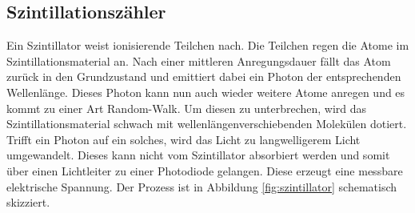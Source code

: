 \subsection{Szintillationszähler}
Ein Szintillator weist ionisierende Teilchen nach. Die Teilchen regen die Atome im Szintillationsmaterial an. Nach einer mittleren Anregungsdauer fällt das Atom zurück in den Grundzustand und emittiert dabei ein Photon der entsprechenden Wellenlänge. Dieses Photon kann nun auch wieder weitere Atome anregen und es kommt zu einer Art Random-Walk. Um diesen zu unterbrechen, wird das Szintillationsmaterial schwach mit wellenlängenverschiebenden Molekülen dotiert. Trifft ein Photon auf ein solches, wird das Licht zu langwelligerem Licht umgewandelt. Dieses kann nicht vom Szintillator absorbiert werden und somit über einen Lichtleiter zu einer Photodiode gelangen. Diese erzeugt eine messbare elektrische Spannung. Der Prozess ist in Abbildung \ref{fig:szintillator} schematisch skizziert.
